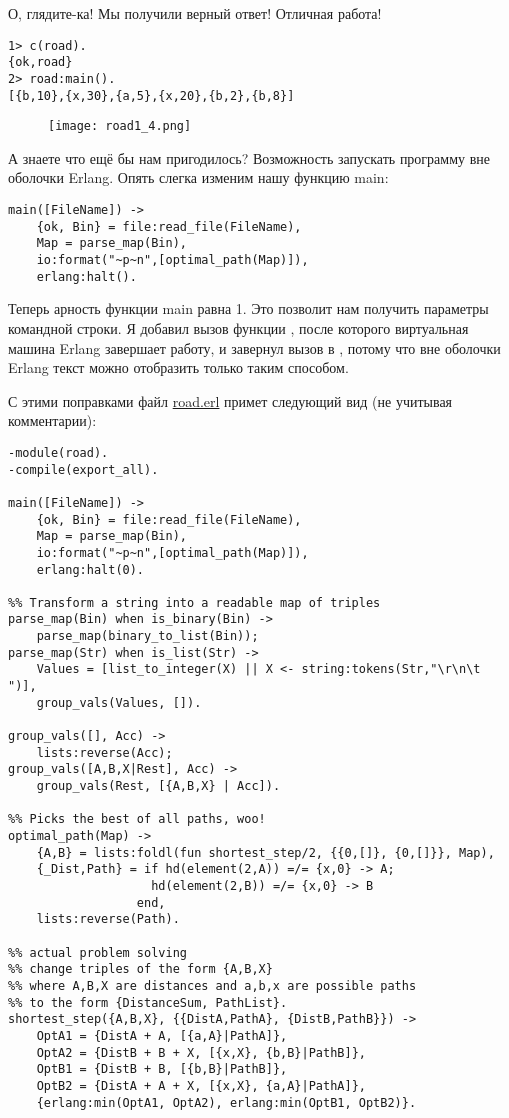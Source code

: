 О, глядите\--ка!
Мы получили верный ответ!
Отличная работа!
\begin{lstlisting}[style=erlang]
1> c(road).
{ok,road}
2> road:main().
[{b,10},{x,30},{a,5},{x,20},{b,2},{b,8}]
\end{lstlisting}

\begin{figure}[h!]
    \texttt{[image: road1\_4.png]}
\end{figure}

А знаете что ещё бы нам пригодилось?
Возможность запускать программу вне оболочки Erlang.
Опять слегка изменим нашу функцию main:
\begin{lstlisting}[style=erlang]
main([FileName]) ->
    {ok, Bin} = file:read_file(FileName),
    Map = parse_map(Bin),
    io:format("~p~n",[optimal_path(Map)]),
    erlang:halt().
\end{lstlisting}

Теперь арность функции main равна 1.
Это позволит нам получить параметры командной строки.
Я добавил вызов функции , после которого виртуальная машина Erlang завершает работу, и завернул вызов  в , потому что вне оболочки Erlang текст можно отобразить только таким способом.

С этими поправками файл \href{http://learnyousomeerlang.com/static/erlang/road.erl}{road.erl} примет следующий вид (не учитывая комментарии):
\begin{lstlisting}[style=erlang]
-module(road).
-compile(export_all).
 
main([FileName]) ->
    {ok, Bin} = file:read_file(FileName),
    Map = parse_map(Bin),
    io:format("~p~n",[optimal_path(Map)]),
    erlang:halt(0).
 
%% Transform a string into a readable map of triples
parse_map(Bin) when is_binary(Bin) ->
    parse_map(binary_to_list(Bin));
parse_map(Str) when is_list(Str) ->
    Values = [list_to_integer(X) || X <- string:tokens(Str,"\r\n\t ")],
    group_vals(Values, []).
 
group_vals([], Acc) ->
    lists:reverse(Acc);
group_vals([A,B,X|Rest], Acc) ->
    group_vals(Rest, [{A,B,X} | Acc]).
 
%% Picks the best of all paths, woo!
optimal_path(Map) ->
    {A,B} = lists:foldl(fun shortest_step/2, {{0,[]}, {0,[]}}, Map),
    {_Dist,Path} = if hd(element(2,A)) =/= {x,0} -> A;
                    hd(element(2,B)) =/= {x,0} -> B
                  end,
    lists:reverse(Path).
 
%% actual problem solving
%% change triples of the form {A,B,X}
%% where A,B,X are distances and a,b,x are possible paths
%% to the form {DistanceSum, PathList}.
shortest_step({A,B,X}, {{DistA,PathA}, {DistB,PathB}}) ->
    OptA1 = {DistA + A, [{a,A}|PathA]},
    OptA2 = {DistB + B + X, [{x,X}, {b,B}|PathB]},
    OptB1 = {DistB + B, [{b,B}|PathB]},
    OptB2 = {DistA + A + X, [{x,X}, {a,A}|PathA]},
    {erlang:min(OptA1, OptA2), erlang:min(OptB1, OptB2)}.
\end{lstlisting}

